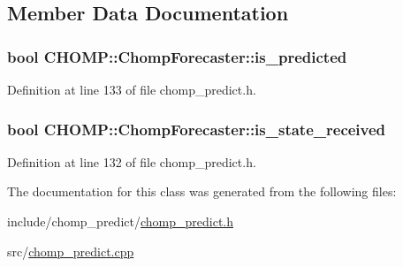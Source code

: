 \subsection{Member Data Documentation}
\subsubsection[{\texorpdfstring{is\+\_\+predicted}{is_predicted}}]{\setlength{\rightskip}{0pt plus 5cm}bool C\+H\+O\+M\+P\+::\+Chomp\+Forecaster\+::is\+\_\+predicted}\hypertarget{class_c_h_o_m_p_1_1_chomp_forecaster_ae092aa988e2587db915e287fc3fa0aff}{}\label{class_c_h_o_m_p_1_1_chomp_forecaster_ae092aa988e2587db915e287fc3fa0aff}


Definition at line 133 of file chomp\+\_\+predict.\+h.

\subsubsection[{\texorpdfstring{is\+\_\+state\+\_\+received}{is_state_received}}]{\setlength{\rightskip}{0pt plus 5cm}bool C\+H\+O\+M\+P\+::\+Chomp\+Forecaster\+::is\+\_\+state\+\_\+received}\hypertarget{class_c_h_o_m_p_1_1_chomp_forecaster_ae642d133970543c83eebd153d74e8459}{}\label{class_c_h_o_m_p_1_1_chomp_forecaster_ae642d133970543c83eebd153d74e8459}


Definition at line 132 of file chomp\+\_\+predict.\+h.



The documentation for this class was generated from the following files\+:\begin{DoxyCompactItemize}
\item 
include/chomp\+\_\+predict/\hyperlink{chomp__predict_8h}{chomp\+\_\+predict.\+h}\item 
src/\hyperlink{chomp__predict_8cpp}{chomp\+\_\+predict.\+cpp}\end{DoxyCompactItemize}
